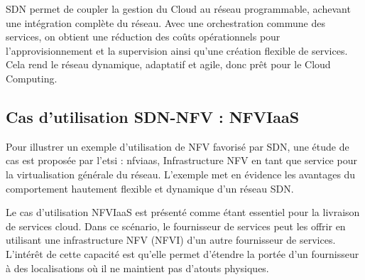 SDN permet de coupler la gestion du Cloud au réseau programmable, achevant une intégration complète du réseau. Avec une orchestration commune des services, on obtient une réduction des coûts opérationnels pour l'approvisionnement et la supervision ainsi qu'une création flexible de services. Cela rend le réseau dynamique, adaptatif et agile, donc prêt pour le Cloud Computing. \cite{OFSDNNFVand} \cite{realTimeCloudNetworkEnabled} 


\subsection{Cas d'utilisation SDN-NFV : NFVIaaS}

Pour illustrer un exemple d'utilisation de NFV favorisé par SDN, une étude de cas est proposée par l'\gls{etsi} : \gls{nfv}\gls{iaas}, Infrastructure NFV en tant que service pour la virtualisation générale du réseau. L'exemple met en évidence les avantages du comportement hautement flexible et dynamique d'un réseau SDN.

Le cas d'utilisation NFVIaaS est présenté comme étant essentiel pour la livraison de services cloud. Dans ce scénario, le fournisseur de services peut les offrir en utilisant une infrastructure NFV (NFVI) d'un autre fournisseur de services. L'intérêt de cette capacité est qu'elle permet d'étendre la portée d'un fournisseur à des localisations où il ne maintient pas d'atouts physiques.

